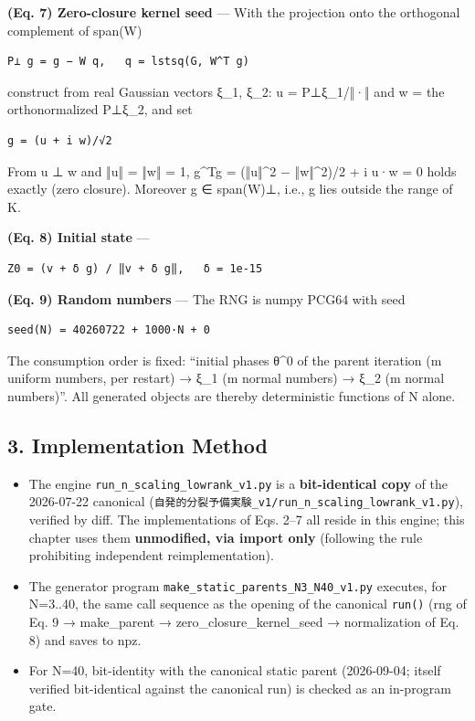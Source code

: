 \documentclass[
  a4paper,
]{ltjsarticle}
\providecommand{\tightlist}{%
  \setlength{\itemsep}{0pt}\setlength{\parskip}{0pt}}
\begin{document}
\textbf{(Eq. 7) Zero-closure kernel seed} --- With the projection onto
the orthogonal complement of span(W)

\begin{verbatim}
P⊥ g = g − W q,   q = lstsq(G, W^T g)
\end{verbatim}

construct from real Gaussian vectors ξ\_1, ξ\_2: u = P⊥ξ\_1/‖·‖ and w =
the orthonormalized P⊥ξ\_2, and set

\begin{verbatim}
g = (u + i w)/√2
\end{verbatim}

From u ⊥ w and ‖u‖ = ‖w‖ = 1, g\^{}Tg = (‖u‖\^{}2 − ‖w‖\^{}2)/2 + i u·w
= 0 holds exactly (zero closure). Moreover g ∈ span(W)⊥, i.e., g lies
outside the range of K.

\textbf{(Eq. 8) Initial state} ---

\begin{verbatim}
Z0 = (v + δ g) / ‖v + δ g‖,   δ = 1e-15
\end{verbatim}

\textbf{(Eq. 9) Random numbers} --- The RNG is numpy PCG64 with seed

\begin{verbatim}
seed(N) = 40260722 + 1000·N + 0
\end{verbatim}

The consumption order is fixed: ``initial phases θ\^{}0 of the parent
iteration (m uniform numbers, per restart) → ξ\_1 (m normal numbers) →
ξ\_2 (m normal numbers)''. All generated objects are thereby
deterministic functions of N alone.

\subsection{3. Implementation Method}\label{implementation-method}

\begin{itemize}
\tightlist
\item
  The engine \texttt{run\_n\_scaling\_lowrank\_v1.py} is a
  \textbf{bit-identical copy} of the 2026-07-22 canonical
  (\texttt{自発的分裂予備実験\_v1/run\_n\_scaling\_lowrank\_v1.py}),
  verified by diff. The implementations of Eqs. 2--7 all reside in this
  engine; this chapter uses them \textbf{unmodified, via import only}
  (following the rule prohibiting independent reimplementation).
\item
  The generator program \texttt{make\_static\_parents\_N3\_N40\_v1.py}
  executes, for N=3..40, the same call sequence as the opening of the
  canonical \texttt{run()} (rng of Eq. 9 → make\_parent →
  zero\_closure\_kernel\_seed → normalization of Eq. 8) and saves to
  npz.
\item
  For N=40, bit-identity with the canonical static parent (2026-09-04;
  itself verified bit-identical against the canonical run) is checked as
  an in-program gate.
\end{itemize}
\end{document}

